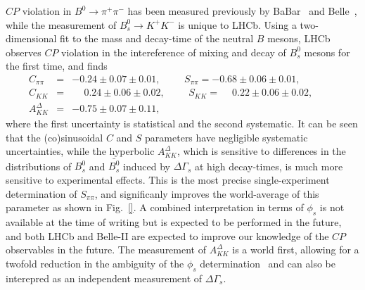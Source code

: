 $CP$ violation in $B^0 \to \pi^+ \pi^-$ has been measured previously by BaBar~\cite{} and Belle~\cite{},
while the measurement of $B^0_s \to K^+ K^-$ is unique to LHCb. Using a two-dimensional fit to the mass and decay-time
of the neutral $B$ mesons, LHCb observes $CP$ violation in the intereference of mixing and decay of $B^0_s$ mesons for the first time, 
and finds
\begin{eqnarray}
C_{\pi\pi}      &=& -0.24 \pm 0.07 \pm 0.01,\phantom{space}
S_{\pi\pi}      = -0.68 \pm 0.06 \pm 0.01,\phantom{space}
\\
C_{KK}      &=& \phantom{+}0.24 \pm 0.06 \pm 0.02,\phantom{space}
S_{KK}      = \phantom{+}0.22 \pm 0.06 \pm 0.02,\phantom{space}
\\
A^{\Delta}_{KK}      &=& -0.75 \pm 0.07 \pm 0.11,\phantom{space}
\end{eqnarray}
where the first uncertainty is statistical and the second systematic. It can be seen that the (co)sinusoidal $C$ and $S$ parameters have
negligible systematic uncertainties, while the hyperbolic $A^{\Delta}_{KK}$, which is sensitive to differences in the distributions
of $B^0_s$ and $\bar{B^0_s}$ induced by $\Delta\Gamma_s$ at high decay-times, is much more sensitive to experimental effects.
This is the most precise single-experiment
determination of $S_{\pi\pi}$, and significanly improves the world-average of this parameter as shown in Fig.~\ref{}.
A combined interpretation in terms of $\phi_s$ is not available at the time of writing but is expected to be performed
in the future, and both LHCb and Belle-II are expected to improve our knowledge of the $CP$ observables in the future. 
The measurement of $A^{\Delta}_{KK}$ is a world first, allowing for a twofold reduction in the ambiguity of the $\phi_s$ determination~\cite{}
and can also be interepred as an independent measurement of $\Delta\Gamma_s$.
